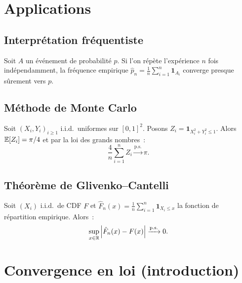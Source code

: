 \section{Applications}

\subsection{Interpr\'etation fr\'equentiste}

\begin{corollaire}
Soit $A$ un \'ev\'enement de probabilit\'e $p$. Si l'on r\'ep\`ete l'exp\'erience
$n$ fois ind\'ependamment, la fr\'equence empirique
$\hat{p}_n = \frac{1}{n}\sum_{i=1}^n \mathbf{1}_{A_i}$ converge presque s\^urement
vers $p$.
\end{corollaire}

\subsection{M\'ethode de Monte Carlo}

\begin{exemple}[Estimation de $\pi$]
Soit $(X_i, Y_i)_{i \geq 1}$ i.i.d.\ uniformes sur $[0,1]^2$. Posons
$Z_i = \mathbf{1}_{X_i^2 + Y_i^2 \leq 1}$. Alors $\mathbb{E}[Z_i] = \pi/4$ et par la
loi des grands nombres~:
\[
    \frac{4}{n}\sum_{i=1}^n Z_i \xrightarrow{\text{p.s.}} \pi.
\]
\end{exemple}

\subsection{Th\'eor\`eme de Glivenko--Cantelli}

\begin{theoreme}
Soit $(X_i)$ i.i.d.\ de CDF $F$ et $\hat{F}_n(x) = \frac{1}{n}\sum_{i=1}^n
\mathbf{1}_{X_i \leq x}$ la fonction de r\'epartition empirique. Alors~:
\[
    \sup_{x \in \mathbb{R}} \left| \hat{F}_n(x) - F(x) \right| \xrightarrow{\text{p.s.}} 0.
\]
\end{theoreme}

\section{Convergence en loi (introduction)}


